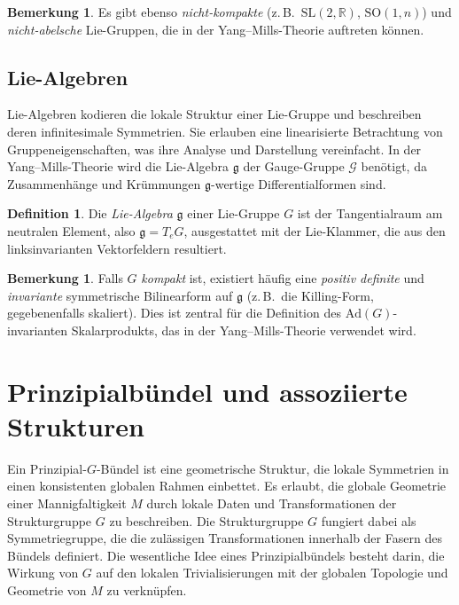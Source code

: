 \documentclass[10pt, letterpaper]{article}
\theoremstyle{custom}
\theoremstyle{definition}
\newtheorem{definition}[theorem]{Definition}
\newtheorem{remark}[theorem]{Bemerkung}
\begin{document}
\begin{remark}
Es gibt ebenso \emph{nicht-kompakte} (z.\,B.\ \(\mathrm{SL}(2,\mathbb{R})\), \(\mathrm{SO}(1,n)\)) und \emph{nicht-abelsche} Lie-Gruppen, die in der Yang--Mills-Theorie auftreten können.
\end{remark}

\subsection{Lie-Algebren}
Lie-Algebren kodieren die lokale Struktur einer Lie-Gruppe und beschreiben deren infinitesimale Symmetrien. Sie erlauben eine linearisierte Betrachtung von Gruppeneigenschaften, was ihre Analyse und Darstellung vereinfacht. In der Yang--Mills-Theorie wird die Lie-Algebra \(\mathfrak{g}\) der Gauge-Gruppe \(\mathcal{G}\) benötigt, da Zusammenhänge und Krümmungen \(\mathfrak{g}\)-wertige Differentialformen sind.

\begin{definition}
Die \emph{Lie-Algebra} \(\mathfrak{g}\) einer Lie-Gruppe \(G\) ist der Tangentialraum am neutralen Element, also \(\mathfrak{g} = T_e G\), ausgestattet mit der Lie-Klammer, die aus den linksinvarianten Vektorfeldern resultiert.
\end{definition}

\begin{remark}
Falls \(G\) \emph{kompakt} ist, existiert häufig eine \emph{positiv definite} und \emph{invariante} symmetrische Bilinearform auf \(\mathfrak{g}\) (z.\,B.\ die Killing-Form, gegebenenfalls skaliert). Dies ist zentral für die Definition des \(\mathrm{Ad}(G)\)-invarianten Skalarprodukts, das in der Yang--Mills-Theorie verwendet wird.
\end{remark}

\section{Prinzipialbündel und assoziierte Strukturen}

Ein Prinzipial-\(G\)-Bündel ist eine geometrische Struktur, die lokale Symmetrien in einen konsistenten globalen Rahmen einbettet. Es erlaubt, die globale Geometrie einer Mannigfaltigkeit \(M\) durch lokale Daten und Transformationen der Strukturgruppe \(G\) zu beschreiben. Die Strukturgruppe \(G\) fungiert dabei als Symmetriegruppe, die die zulässigen Transformationen innerhalb der Fasern des Bündels definiert. Die wesentliche Idee eines Prinzipialbündels besteht darin, die Wirkung von \(G\) auf den lokalen Trivialisierungen mit der globalen Topologie und Geometrie von \(M\) zu verknüpfen.
\end{document}

